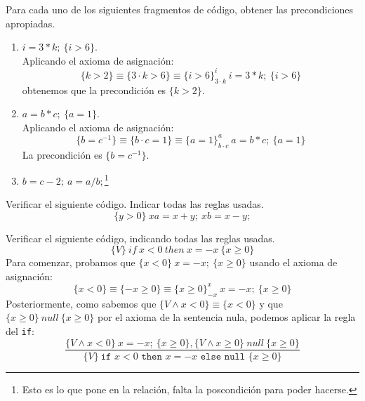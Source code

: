 \begin{ejercicio}
    Para cada uno de los siguientes fragmentos de código, obtener las precondiciones apropiadas.
    \begin{enumerate}[label=(\alph*)]
        \item $i=3\ast k;\ \{i>6\}$.\\
            Aplicando el axioma de asignación:
            \begin{equation*}
                \{k>2\} \equiv \{3\cdot k>6\} \equiv \{i>6\}^i_{3\cdot k}\ i=3\ast k;\ \{i>6\}
            \end{equation*}
            obtenemos que la precondición es $\{k>2\}$.
        \item $a=b\ast c;\ \{a=1\}$.\\
            Aplicando el axioma de asignación:
            \begin{equation*}
                \{b = c^{-1}\} \equiv \{b\cdot c = 1\} \equiv \{a=1\}^a_{b\cdot c}\ a=b\ast c;\ \{a=1\}
            \end{equation*}
        La precondición es $\{b=c^{-1}\}$.
        \item $b=c-2;\ a=a/b;$\footnote{Esto es lo que pone en la relación, falta la poscondición para poder hacerse.}
    \end{enumerate}
\end{ejercicio}

\begin{ejercicio}
    Verificar el siguiente código. Indicar todas las reglas usadas.
    \begin{equation*}
        \{y>0\}\ xa=x+y;\ xb=x-y;
    \end{equation*}
\end{ejercicio}

\begin{ejercicio}
    Verificar el siguiente código, indicando todas las reglas usadas.
    \begin{equation*}
        \{V\}\ if\ x < 0\ then\ x = -x\ \{x\geq 0\}
    \end{equation*}
    Para comenzar, probamos que $\{x<0\}\ x=-x;\ \{x\geq 0\}$ usando el axioma de asignación:
    \begin{equation*}
        \{x<0\} \equiv \{-x\geq 0\} \equiv \{x\geq 0\}^x_{-x}\ x=-x;\ \{x\geq 0\}
    \end{equation*}
    Posteriormente, como sabemos que $\{V \land x<0\}\equiv \{x<0\}$ y que ${\{x\geq 0\}\ null\ \{x\geq 0\}}$ por el axioma de la sentencia nula, podemos aplicar la regla del \texttt{if}:
    \begin{equation*}
        \dfrac{\{V \land x<0\}\ x=-x;\ \{x\geq 0\}, \{V \land x\geq 0\}\ null\ \{x\geq 0\}}{\{V\}\ \texttt{if\ }x<0 \texttt{\ then\ }x=-x \texttt{\ else\ null\ } \{x\geq 0\}}
    \end{equation*}
\end{ejercicio}

